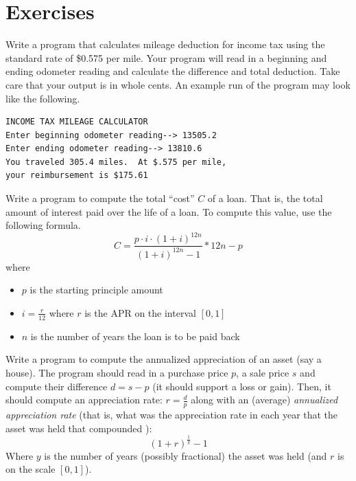 

\section{Exercises}


\begin{exer}
Write a program that calculates mileage deduction for income tax using the
standard rate of \$0.575 per mile.  Your program will read in a beginning
and ending odometer reading and calculate the difference and total 
deduction.  Take care that your output is in whole cents.  An example run
of the program may look like the following.

\begin{verbatim}
INCOME TAX MILEAGE CALCULATOR
Enter beginning odometer reading--> 13505.2
Enter ending odometer reading--> 13810.6
You traveled 305.4 miles.  At $.575 per mile,
your reimbursement is $175.61
\end{verbatim}
\end{exer}

\begin{exer}
Write a program to compute the total ``cost'' $C$ of a loan.  That is, the total amount of interest paid over
the life of a loan.  To compute this value, use the following formula.
$$C = \frac{p\cdot i \cdot \left(1 + i\right)^{12n}}{(1+i)^{12n} - 1} * 12n - p$$
where
\begin{itemize}
  \item $p$ is the starting principle amount
  \item $i = \frac{r}{12}$ where $r$ is the APR on the interval $[0, 1]$
  \item $n$ is the number of years the loan is to be paid back
\end{itemize}
\end{exer}

\begin{exer}
Write a program to compute the annualized appreciation of an asset (say a house).  The program
should read in a purchase price $p$, a sale price $s$ and compute their difference $d = s - p$ 
(it should support a loss or gain).  Then, it should compute an appreciation rate: $r = \frac{d}{p}$ along
with an (average) \emph{annualized appreciation rate} (that is, what was the appreciation rate in each
year that the asset was held that compounded ):
$$(1 + r)^{\frac{1}{y}}-1$$
Where $y$ is the number of years (possibly fractional) the asset was held (and $r$ is on the 
scale $[0, 1]$).
\end{exer}

